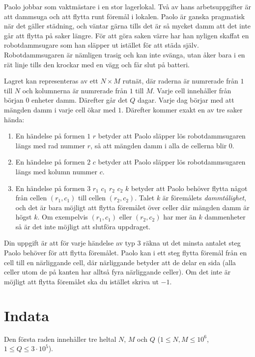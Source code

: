 Paolo jobbar som vaktmästare i en stor lagerlokal. Två av hans arbetsuppgifter är att dammsuga och att flytta runt föremål 
i lokalen. Paolo är ganska pragmatisk när det gäller städning, och väntar gärna tills det är så mycket damm att det inte går 
att flytta på saker längre. För att göra saken värre har han nyligen skaffat en robotdammsugare som han släpper ut istället för 
att städa själv. Robotdammsugaren är nämligen trasig och kan inte svänga, utan åker bara i en rät linje tills den krockar
med en vägg och får slut på batteri.

Lagret kan representeras av ett $N \times M$ rutnät, där raderna är numrerade från $1$ till $N$ och kolumnerna är numrerade från $1$ till $M$.
Varje cell innehåller från början $0$ enheter damm. Därefter går det $Q$ dagar. 
Varje dag börjar med att mängden damm i varje cell ökar med $1$. Därefter kommer exakt en av tre saker hända:

\begin{enumerate}
\item En händelse på formen $1$ $r$ betyder att Paolo släpper lös robotdammsugaren längs med rad nummer $r$, så att mängden damm
i alla de cellerna blir $0$.
\item En händelse på formen $2$ $c$ betyder att Paolo släpper lös robotdammsugaren längs med kolumn nummer $c$.
\item En händelse på formen $3$ $r_1$ $c_1$ $r_2$ $c_2$ $k$ betyder att Paolo behöver flytta något från cellen $(r_1, c_1)$ till
cellen $(r_2, c_2)$. Talet $k$ är föremålets \textit{dammtålighet}, och det är bara möjligt att flytta föremålet över celler där 
mängden damm är högst $k$. Om exempelvis $(r_1, c_1)$ eller $(r_2, c_2)$ har mer än $k$ dammenheter så är det inte möjligt att 
slutföra uppdraget.

\end{enumerate}

Din uppgift är att för varje händelse av typ $3$ räkna ut det minsta antalet steg Paolo behöver för att flytta föremålet. 
Paolo kan i ett steg flytta föremål från en cell till en närliggande cell, där närliggande betyder att de delar en sida 
(alla celler utom de på kanten har alltså fyra närliggande celler). 
Om det inte är möjligt att flytta föremålet ska du istället skriva ut $-1$.

\section*{Indata}
Den första raden innehåller tre heltal $N$, $M$ och $Q$ ($1 \leq N,M \leq 10^6$, $1 \leq Q \leq 3 \cdot 10^5$).

